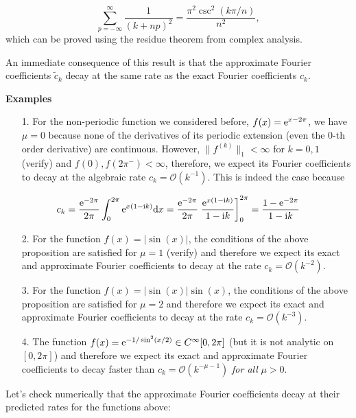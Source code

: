 \documentclass[12pt,landscape]{article}
\begin{document}
{\[
    \sum_{p=-\infty}^{\infty} \frac{1}{(k+np)^2} = \frac{\pi^2\csc^2(k\pi/n) }{n^2},
\]
which can be proved using the residue theorem from complex analysis.

An immediate consequence of this result is that the approximate Fourier coefficients $\widetilde{c}_k$ decay at the same rate as the exact Fourier coefficients $c_k$.

\textbf{Examples}  

\begin{itemize}
\item[1. ] For the non-periodic function we considered before, $f(x) = {\rm e}^{x-2\pi}$, we have $\mu = 0$ because none of the derivatives of its periodic extension (even the $0$-th order derivative) are continuous.  However, $\| f^{(k)} \|_{1} < \infty$ for $k = 0, 1$ (verify) and $f(0), f(2\pi^{-}) < \infty$, therefore, we expect its Fourier coefficients to decay at the algebraic rate $c_k = \mathcal{O}(k^{-1})$. This is indeed the case because

\end{itemize}
\[
c_{k} = \frac{{\rm e}^{-2\pi}}{2\pi}\int_{0}^{2\pi} {\rm e}^{x(1-{\rm i}k)}{\rm d}x = \frac{{\rm e}^{-2\pi}}{2\pi } \left. \frac{{\rm e}^{x(1-{\rm i}k)}}{1-{\rm i}k}   \right]_{0}^{2\pi} = \frac{1 - {\rm e}^{-2\pi}}{1-{\rm i}k}
\]
\begin{itemize}
\item[2. ] For the function $f(x) = \vert \sin(x) \vert$, the conditions of the above proposition are satisfied for $\mu = 1$ (verify) and therefore we expect its exact and approximate Fourier coefficients to decay at the rate $c_k = \mathcal{O}(k^{-2})$.


\item[3. ] For the function $f(x) = \vert \sin(x) \vert \sin(x)$, the conditions of the above proposition are satisfied for $\mu = 2$ and therefore we expect its exact and approximate Fourier coefficients to decay at the rate $c_k = \mathcal{O}(k^{-3})$.


\item[4. ] The function $f(x) = {\rm e}^{-1/\sin^2(x/2)} \in C^{\infty}[0, 2\pi]$ (but it is not analytic on $[0, 2\pi]$) and therefore we expect its exact and approximate Fourier coefficients to decay faster than $c_k = \mathcal{O}(k^{-\mu-1})$ \emph{for all} $\mu > 0$.

\end{itemize}
Let's check numerically that the approximate Fourier coefficients decay at their predicted rates for the functions above:


}
\end{document}
